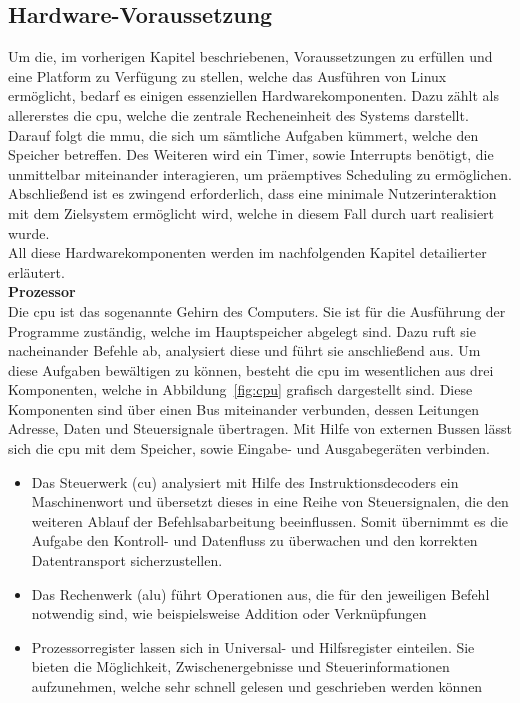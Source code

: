 \subsection{Hardware-Voraussetzung}\label{kap:hardwarevoraussetzung}

Um die, im vorherigen Kapitel beschriebenen, Voraussetzungen zu erfüllen und eine Platform zu Verfügung zu stellen, welche das Ausführen von Linux ermöglicht, bedarf es
einigen essenziellen Hardwarekomponenten. Dazu zählt als allererstes die \ac{cpu}, welche die zentrale Recheneinheit des Systems darstellt. Darauf folgt die \ac{mmu}, die sich um sämtliche Aufgaben kümmert,
welche den Speicher betreffen. Des Weiteren wird ein Timer, sowie Interrupts benötigt, die unmittelbar miteinander interagieren, um präemptives Scheduling zu ermöglichen. Abschließend
ist es zwingend erforderlich, dass eine minimale Nutzerinteraktion mit dem Zielsystem ermöglicht wird, welche in diesem Fall durch \ac{uart} realisiert wurde.\\
All diese Hardwarekomponenten werden im nachfolgenden Kapitel detailierter erläutert.\\

\textbf{Prozessor}\\
Die \ac{cpu} ist das sogenannte Gehirn des Computers. Sie ist für die Ausführung der Programme zuständig, welche im Hauptspeicher abgelegt sind. Dazu ruft sie nacheinander
Befehle ab, analysiert diese und führt sie anschließend aus. Um diese Aufgaben bewältigen zu können, besteht die \ac{cpu} im wesentlichen aus drei Komponenten, welche
in Abbildung~\ref{fig:cpu} grafisch dargestellt sind. Diese Komponenten sind über einen Bus miteinander verbunden, dessen Leitungen Adresse, Daten und Steuersignale übertragen. Mit Hilfe von externen Bussen lässt sich die \ac{cpu} mit dem Speicher, sowie Eingabe- und Ausgabegeräten
verbinden.~\cite{cache}
\begin{itemize}
  \item Das Steuerwerk (\ac{cu}) analysiert mit Hilfe des Instruktionsdecoders ein Maschinenwort und übersetzt dieses in eine Reihe von Steuersignalen, die den weiteren
        Ablauf der Befehlsabarbeitung beeinflussen. Somit übernimmt es die Aufgabe den Kontroll- und Datenfluss zu überwachen und den korrekten Datentransport sicherzustellen.~\cite{benchmark}
  \item Das Rechenwerk (\ac{alu}) führt Operationen aus, die für den jeweiligen Befehl notwendig sind, wie beispielsweise Addition oder Verknüpfungen~\cite{benchmark}
  \item Prozessorregister lassen sich in Universal- und Hilfsregister einteilen. Sie bieten die Möglichkeit, Zwischenergebnisse und Steuerinformationen aufzunehmen,
        welche sehr schnell gelesen und geschrieben werden können~\cite{benchmark}
\end{itemize}

